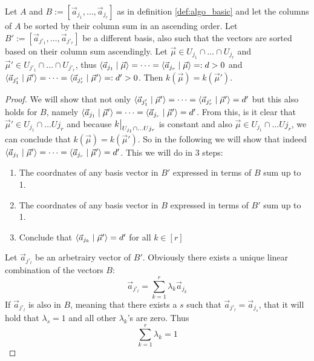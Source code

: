 \begin{lemma}
    Let $A$ and $B := [\vec a_{j_1}, \dots, \vec a_{j_r}]$ as in definition \ref{def:algo_basic} and let the columns of $A$ be sorted by their column sum in an ascending order. Let $B' := [\vec a_{j'_1}, \dots, \vec a_{j'_r}]$ be a different basis, also such that the vectors are sorted based on their column sum ascendingly. Let $\vec\mu \in U_{j_1} \cap \dots \cap U_{j_r}$ and $\vec\mu' \in U_{j'_1} \cap \dots \cap U_{j'_r}$, thus $\langle \vec a_{j_1} \mid \vec\mu \rangle = \dots = \langle \vec a_{j_r} \mid \vec\mu \rangle =: d > 0$ and $\langle \vec a_{j'_1} \mid \vec\mu' \rangle = \dots = \langle \vec a_{j'_r} \mid \vec\mu' \rangle =: d' > 0$. Then $k(\vec\mu) = k(\vec\mu')$.
\end{lemma}
\begin{proof}
    We will show that not only $\langle \vec a_{j'_1} \mid \vec\mu' \rangle = \dots = \langle \vec a_{j'_r} \mid \vec\mu' \rangle = d'$ but this also holds for $B$, namely $\langle \vec a_{j_1} \mid \vec\mu' \rangle = \dots = \langle \vec a_{j_r} \mid \vec\mu' \rangle = d'$. From this, is it clear that $\vec\mu' \in U_{j_1} \cap \dots U{j_r}$ and because $\restrict{k}{U_{j_1} \cap \dots U{j_r}}$ is constant and also $\vec\mu \in U_{j_1} \cap \dots U{j_r}$, we can conclude that $k(\vec\mu) = k(\vec\mu')$. So in the following we will show that indeed $\langle \vec a_{j_1} \mid \vec\mu' \rangle = \dots = \langle \vec a_{j_r} \mid \vec\mu' \rangle = d'$. This we will do in 3 steps:
    \begin{enumerate}
        \item The coordnates of any basis vector in $B'$ expressed in terms of $B$ sum up to 1.
        \item The coordnates of any basis vector in $B$ expressed in terms of $B'$ sum up to 1.
        \item Conclude that $\langle \vec a_{j_k} \mid \vec\mu' \rangle = d'$ for all $k \in [r]$
    \end{enumerate}

    Let $\vec a_{j'_l}$ be an arbetrairy vector of $B'$. Obviously there exists a unique linear combination of the vectors $B$:
    $$\vec a_{j'_l} = \sum_{k=1}^{r}\lambda_k\vec a_{j_k}$$
    If $\vec a_{j'_l}$ is also in $B$, meaning that there exists a $s$ such that $\vec a_{j'_l} = \vec a_{j_s}$, that it will hold that $\lambda_s = 1$ and all other $\lambda_k$'s are zero. Thus
    $$\sum_{k=1}^{r}\lambda_k = 1$$


\end{proof}
